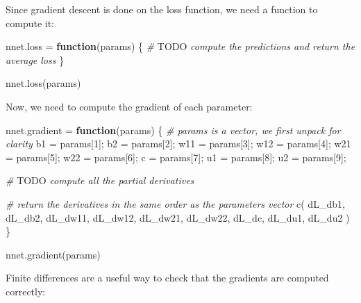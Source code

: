\documentclass[
  a4paper,
]{article}
\newenvironment{Shaded}{\begin{snugshade}}{\end{snugshade}}
\newcommand{\AlertTok}[1]{\textcolor[rgb]{0.94,0.16,0.16}{#1}}
\newcommand{\CommentTok}[1]{\textcolor[rgb]{0.56,0.35,0.01}{\textit{#1}}}
\newcommand{\ControlFlowTok}[1]{\textcolor[rgb]{0.13,0.29,0.53}{\textbf{#1}}}
\newcommand{\DecValTok}[1]{\textcolor[rgb]{0.00,0.00,0.81}{#1}}
\newcommand{\FunctionTok}[1]{\textcolor[rgb]{0.00,0.00,0.00}{#1}}
\newcommand{\NormalTok}[1]{#1}
\newcommand{\OtherTok}[1]{\textcolor[rgb]{0.56,0.35,0.01}{#1}}
\begin{document}
Since gradient descent is done on the loss function, we need a function
to compute it:

\begin{Shaded}
\begin{Highlighting}[]
\NormalTok{nnet.loss }\OtherTok{=} \ControlFlowTok{function}\NormalTok{(params) \{}
  \CommentTok{\# }\AlertTok{TODO}\CommentTok{ compute the predictions and return the average loss}
\NormalTok{\}}

\FunctionTok{nnet.loss}\NormalTok{(params)}
\end{Highlighting}
\end{Shaded}

Now, we need to compute the gradient of each parameter:

\begin{Shaded}
\begin{Highlighting}[]
\NormalTok{nnet.gradient }\OtherTok{=} \ControlFlowTok{function}\NormalTok{(params) \{}
  \CommentTok{\# params is a vector, we first unpack for clarity}
\NormalTok{  b1 }\OtherTok{=}\NormalTok{ params[}\DecValTok{1}\NormalTok{]; b2 }\OtherTok{=}\NormalTok{ params[}\DecValTok{2}\NormalTok{];}
\NormalTok{  w11 }\OtherTok{=}\NormalTok{ params[}\DecValTok{3}\NormalTok{]; w12 }\OtherTok{=}\NormalTok{ params[}\DecValTok{4}\NormalTok{];}
\NormalTok{  w21 }\OtherTok{=}\NormalTok{ params[}\DecValTok{5}\NormalTok{]; w22 }\OtherTok{=}\NormalTok{ params[}\DecValTok{6}\NormalTok{];}
\NormalTok{  c }\OtherTok{=}\NormalTok{ params[}\DecValTok{7}\NormalTok{]; u1 }\OtherTok{=}\NormalTok{ params[}\DecValTok{8}\NormalTok{]; u2 }\OtherTok{=}\NormalTok{ params[}\DecValTok{9}\NormalTok{];}
  
  \CommentTok{\# }\AlertTok{TODO}\CommentTok{ compute all the partial derivatives}
  
  \CommentTok{\# return the derivatives in the same order as the parameters vector}
  \FunctionTok{c}\NormalTok{(}
\NormalTok{    dL\_db1, dL\_db2,}
\NormalTok{    dL\_dw11, dL\_dw12,}
\NormalTok{    dL\_dw21, dL\_dw22,}
\NormalTok{    dL\_dc, dL\_du1, dL\_du2}
\NormalTok{  )}
\NormalTok{\}}

\FunctionTok{nnet.gradient}\NormalTok{(params)}
\end{Highlighting}
\end{Shaded}

Finite differences are a useful way to check that the gradients are
computed correctly:
\end{document}
